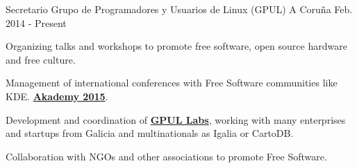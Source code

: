 


\begin{cventries}


\cventry
{Secretario} %
{Grupo de Programadores y Usuarios de Linux (GPUL)} %
{A Coruña} %
{Feb. 2014 - Present} %
{ %
\begin{cvitems}
\item {Organizing talks and workshops to promote free software, open 
source hardware and free culture.}
\item {Management of international conferences with Free Software 
communities like KDE. \textbf{\href{https://akademy.kde.org/2015}{Akademy 
2015}}.}
\item {Development and coordination of 
\textbf{\href{http://labs.gpul.org/}{GPUL Labs}}, working with many enterprises 
and startups from Galicia and multinationals as Igalia or CartoDB.}
\item {Collaboration with NGOs and other associations to promote Free 
Software.}
\end{cvitems}
}



\end{cventries}